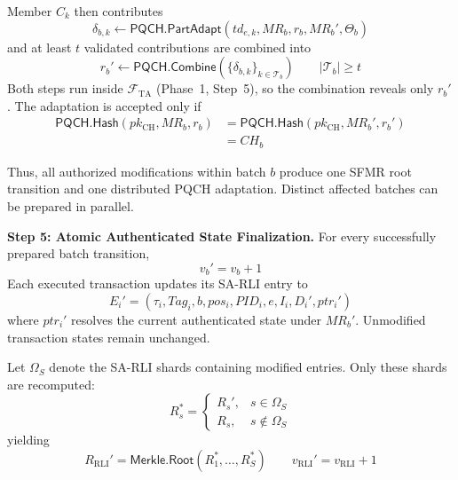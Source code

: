 \documentclass[lettersize,journal]{IEEEtran}
\begin{document}
Member $C_k$ then contributes
\begin{equation}
\delta_{b,k}
\leftarrow
\mathsf{PQCH.PartAdapt}
(td_{e,k},MR_b,r_b,MR_b',\Theta_b)
\end{equation}
and at least $t$ validated contributions are combined into
\begin{equation}
r_b'
\leftarrow
\mathsf{PQCH.Combine}
(\{\delta_{b,k}\}_{k\in\mathcal{T}_b})
\qquad
|\mathcal{T}_b|\geq t
\end{equation}
Both steps run inside $\mathcal{F}_{\mathrm{TA}}$ (Phase~1, Step~5), so
the combination reveals only $r_b'$. The adaptation is accepted only if
\begin{equation}
\begin{aligned}
\mathsf{PQCH.Hash}(pk_{\mathrm{CH}},MR_b,r_b)
&=
\mathsf{PQCH.Hash}(pk_{\mathrm{CH}},MR_b',r_b')\\
&=CH_b
\end{aligned}
\label{eq:pqch_cont}
\end{equation}

Thus, all authorized modifications within batch $b$ produce one SFMR
root transition and one distributed PQCH adaptation. Distinct affected
batches can be prepared in parallel.

\medskip
\noindent\textbf{Step 5: Atomic Authenticated State Finalization.}
For every successfully prepared batch transition,
\begin{equation}
v_b'=v_b+1
\end{equation}
Each executed transaction updates its SA-RLI entry to
\begin{equation}
E_i'
=
(\tau_i,Tag_i,b,pos_i,PID_i,e,I_i,D_i',ptr_i')
\end{equation}
where $ptr_i'$ resolves the current authenticated state under $MR_b'$.
Unmodified transaction states remain unchanged.

Let $\Omega_S$ denote the SA-RLI shards containing modified entries.
Only these shards are recomputed:
\begin{equation}
R_s^{*}=
\begin{cases}
R_s', & s\in\Omega_S\\
R_s,  & s\notin\Omega_S
\end{cases}
\end{equation}
yielding
\begin{equation}
R_{\mathrm{RLI}}'
=
\mathsf{Merkle.Root}(R_1^{*},\ldots,R_S^{*})
\qquad
v_{\mathrm{RLI}}'=v_{\mathrm{RLI}}+1
\end{equation}
\end{document}
